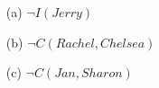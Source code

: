 \documentclass[12pt,addpoints]{exam}
\newcommand{\ra}{\rightarrow}
\newcommand{\lra}{\leftrightarrow}
\begin{document}
\begin{questions}
    \begin{solution}
    \begin{itemize}
        \item[(a)] $\neg I(Jerry)$
        \item[(b)] $\neg C(Rachel, Chelsea)$
        \item[(c)] $\neg C(Jan, Sharon)$
    \end{itemize}
    \end{solution}


\end{questions}
\end{document}
